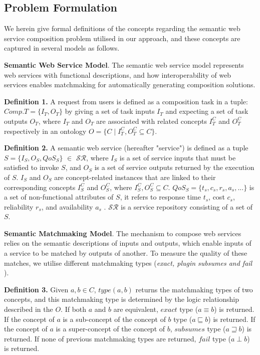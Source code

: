 \documentclass{llncs}
\begin{document}
\subsection{Problem Formulation}\label{problemDes}

We herein give formal definitions of the concepts regarding the semantic web service composition problem utilised in our approach, and these concepts are captured in several models as follows.

\textbf{Semantic Web Service Model}. The semantic web service model represents web services with functional descriptions, and how interoperability of web services enables matchmaking for automatically generating composition solutions.

\textbf{Definition 1.} A request from users is defined as a composition task in a tuple: $Comp.T = \{I_{T}, O_{T}\}$ by giving a set of task inputs $I_{T}$ and expecting  a set of task outputs $O_{T}$, where $I_{T}$ and $O_{T}$ are associated with related concepts $I^{C}_{T}$ and $O^{C}_{T}$ respectively in an ontology $O = \{ C \mid I^{C}_{T}, O^{C}_{T}  \subseteq C \}$.

\textbf{Definition 2.} A semantic web service (hereafter "service") is defined as a tuple $S = \{ I_{S}, O_{S}, QoS_S \}$ $\in$ $\mathcal{SR}$, where $I_{S}$ is a set of service inputs that must be satisfied to invoke $S$, and $O_{S}$ is a set of service outputs returned by the execution of $S$. $I_{S}$ and $O_{S}$ are concept-related instances that are linked to their corresponding concepts $I^{C}_{S}$ and $O^{C}_{S}$, where $ I^{C}_{S}, O^{C}_{S}  \subseteq C$. $QoS_S = \{ t_s, c_s, r_s, a_s, ... \} $ is a set of non-functional attributes of $S$, it refers to response time $t_s$, cost $c_s$, reliability $r_s$, and availability $a_s$ \cite{zeng2003quality}. $\mathcal{SR}$ is a service repository consisting of a set of $S$.
\vspace{0.3cm}

\textbf{Semantic Matchmaking Model}. The mechanism to compose web services relies on the semantic descriptions of inputs and outputs, which enable inputs of a service to be matched by outputs of another. To measure the quality of these matches, we utilise different matchmaking types (\textit{exact, plugin subsumes and fail} \cite{paolucci2002semantic} ).

\textbf{Definition 3.} Given $a, b \in C$, $type(a, b)$ returns the matchmaking types of two concepts, and this matchmaking type is determined by the logic relationship described in the $O$. If both $a$ and $b$ are equivalent, $exact$ type ($a \equiv b$) is returned. If the concept of $a$ is a sub-concept of the concept of $b$ type ($a \sqsubseteq b$) is returned. If the concept of $a$ is a super-concept of the concept of $b$, $subsumes$ type ($a \sqsupseteq b$) is returned. If none of previous matchmaking types are returned, $fail$ type ($a \perp b$) is returned.
\end{document}
